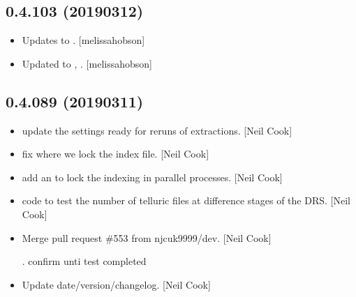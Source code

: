 \documentclass[a4paper,10pt,english]{report}
\begin{document}
\subsection{0.4.103 (2019\sphinxhyphen{}03\sphinxhyphen{}12)}
\label{\detokenize{misc/changelog:id189}}\begin{itemize}
\item {} 
Updates to . {[}melissa\sphinxhyphen{}hobson{]}

\item {} 
Updated to , . {[}melissa\sphinxhyphen{}hobson{]}

\end{itemize}


\subsection{0.4.089 (2019\sphinxhyphen{}03\sphinxhyphen{}11)}
\label{\detokenize{misc/changelog:id190}}\begin{itemize}
\item {} 
 \sphinxhyphen{} update the settings ready for re\sphinxhyphen{}runs of
extractions. {[}Neil Cook{]}

\item {} 
 \sphinxhyphen{} fix where we lock the index file. {[}Neil Cook{]}

\item {} 
 \sphinxhyphen{} add an  to lock the indexing in
parallel processes. {[}Neil Cook{]}

\item {} 
 \sphinxhyphen{} code to test the number of telluric files
at difference stages of the DRS. {[}Neil Cook{]}

\item {} 
Merge pull request \#553 from njcuk9999/dev. {[}Neil Cook{]}

. confirm unti test completed

\item {} 
Update date/version/changelog. {[}Neil Cook{]}

\end{itemize}
\end{document}
